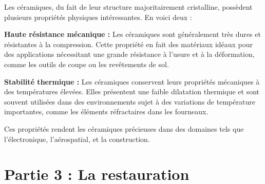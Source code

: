 \documentclass[answers]{exam}
\begin{document}
\begin{solution}
Les céramiques, du fait de leur structure majoritairement cristalline, possèdent plusieurs propriétés physiques intéressantes. En voici deux :

\begin{compactitem}
    \item \textbf{Haute résistance mécanique :} Les céramiques sont généralement très dures et résistantes à la compression. Cette propriété en fait des matériaux idéaux pour des applications nécessitant une grande résistance à l'usure et à la déformation, comme les outils de coupe ou les revêtements de sol.

    \item \textbf{Stabilité thermique :} Les céramiques conservent leurs propriétés mécaniques à des températures élevées. Elles présentent une faible dilatation thermique et sont souvent utilisées dans des environnements sujet à des variations de température importantes, comme les éléments réfractaires dans les fourneaux.

\end{compactitem}

Ces propriétés rendent les céramiques précieuses dans des domaines tels que l'électronique, l'aérospatial, et la construction.
\end{solution}

\section{Partie 3 : La restauration}
\end{document}
